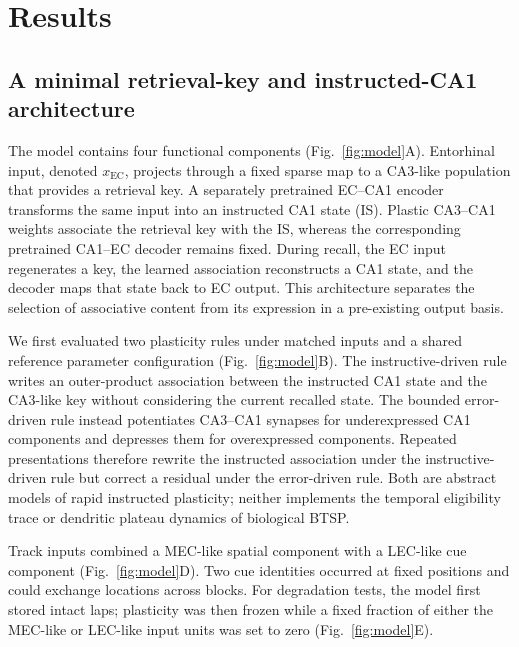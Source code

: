 \section{Results}

\subsection{A minimal retrieval-key and instructed-CA1 architecture}

The model contains four functional components (Fig.~\ref{fig:model}A).
Entorhinal input, denoted $x_{\mathrm{EC}}$, projects through a fixed sparse
map to a CA3-like population that provides a retrieval key. A separately
pretrained EC--CA1 encoder transforms the same input into an instructed CA1
state (IS). Plastic CA3--CA1 weights associate the retrieval key with the IS,
whereas the corresponding pretrained CA1--EC decoder remains fixed. During
recall, the EC input regenerates a key, the learned association reconstructs a
CA1 state, and the decoder maps that state back to EC output. This architecture
separates the selection of associative content from its expression in a
pre-existing output basis.

We first evaluated two plasticity rules under matched inputs and a shared
reference parameter configuration (Fig.~\ref{fig:model}B). The instructive-driven
rule writes an outer-product association between the instructed CA1 state and
the CA3-like key without considering the current recalled state. The bounded
error-driven rule instead potentiates CA3--CA1 synapses for underexpressed CA1
components and depresses them for overexpressed components. Repeated
presentations therefore rewrite the instructed association under the
instructive-driven rule but correct a residual under the error-driven rule.
Both are abstract models of rapid instructed plasticity; neither implements
the temporal eligibility trace or dendritic plateau dynamics of biological
BTSP.

Track inputs combined a MEC-like spatial component with a LEC-like cue
component (Fig.~\ref{fig:model}D). Two cue identities occurred at fixed
positions and could exchange locations across blocks. For degradation tests,
the model first stored intact laps; plasticity was then frozen while a fixed
fraction of either the MEC-like or LEC-like input units was set to zero
(Fig.~\ref{fig:model}E).


